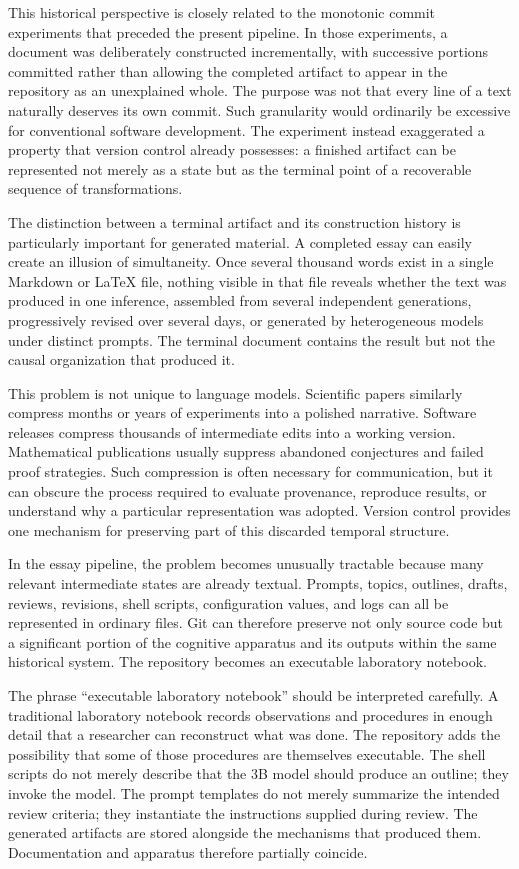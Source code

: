 \documentclass[11pt]{article}
\begin{document}
This historical perspective is closely related to the monotonic commit experiments that preceded the present pipeline. In those experiments, a document was deliberately constructed incrementally, with successive portions committed rather than allowing the completed artifact to appear in the repository as an unexplained whole. The purpose was not that every line of a text naturally deserves its own commit. Such granularity would ordinarily be excessive for conventional software development. The experiment instead exaggerated a property that version control already possesses: a finished artifact can be represented not merely as a state but as the terminal point of a recoverable sequence of transformations.

The distinction between a terminal artifact and its construction history is particularly important for generated material. A completed essay can easily create an illusion of simultaneity. Once several thousand words exist in a single Markdown or \LaTeX{} file, nothing visible in that file reveals whether the text was produced in one inference, assembled from several independent generations, progressively revised over several days, or generated by heterogeneous models under distinct prompts. The terminal document contains the result but not the causal organization that produced it.

This problem is not unique to language models. Scientific papers similarly compress months or years of experiments into a polished narrative. Software releases compress thousands of intermediate edits into a working version. Mathematical publications usually suppress abandoned conjectures and failed proof strategies. Such compression is often necessary for communication, but it can obscure the process required to evaluate provenance, reproduce results, or understand why a particular representation was adopted. Version control provides one mechanism for preserving part of this discarded temporal structure.

In the essay pipeline, the problem becomes unusually tractable because many relevant intermediate states are already textual. Prompts, topics, outlines, drafts, reviews, revisions, shell scripts, configuration values, and logs can all be represented in ordinary files. Git can therefore preserve not only source code but a significant portion of the cognitive apparatus and its outputs within the same historical system. The repository becomes an executable laboratory notebook.

The phrase ``executable laboratory notebook'' should be interpreted carefully. A traditional laboratory notebook records observations and procedures in enough detail that a researcher can reconstruct what was done. The repository adds the possibility that some of those procedures are themselves executable. The shell scripts do not merely describe that the 3B model should produce an outline; they invoke the model. The prompt templates do not merely summarize the intended review criteria; they instantiate the instructions supplied during review. The generated artifacts are stored alongside the mechanisms that produced them. Documentation and apparatus therefore partially coincide.
\end{document}
